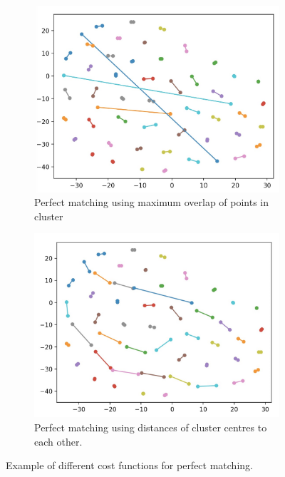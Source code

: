 \documentclass[12pt]{dalthesis}
\begin{document}
\begin{figure}[h]
  \begin{subfigure}[b]{0.5\textwidth}
    \includegraphics[width=\textwidth]{overlap}
    \caption{Perfect matching using maximum overlap of points in cluster}
    \label{fig:overlap}
  \end{subfigure}
  \begin{subfigure}[b]{0.5\textwidth}
    \includegraphics[width=\textwidth]{distance}
    \caption{Perfect matching using distances of cluster centres to each other.}
    \label{fig:distance}
  \end{subfigure}
  \caption{Example of different cost functions for perfect matching.}
\end{figure}
\end{document}

